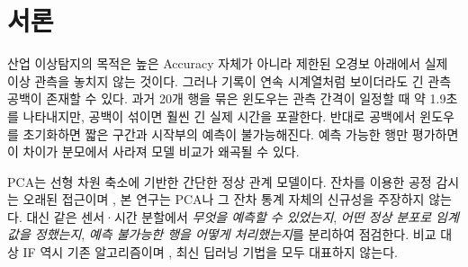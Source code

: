 \documentclass{article}
\begin{document}
\begin{abstract}
산업 센서 이상탐지에서 이동 윈도우의 시간 공백 처리와 예측 불가능한 관측의 제외는 모델 자체의 차이와 함께 평가 결과를 바꾼다.
본 연구는 유압펌프 진동 2채널·전류 1채널 자료에 대해 시간순 버스트 단위 분할, 정상 보정 자료의 경험적 임계값, 동일 관측 행 비교 및 부족한 윈도우의 단일 관측 보완을 결합한 평가 절차를 구현한다.
정상 자료로만 적합한 PCA의 잔차 $Q$, 유지 부분공간의 $T^2$, 보정 결합 점수를 비교하고, 동일 특징을 사용하는 Isolation Forest를 세 seed로 평가한다.
개발 자료로 선택하고 고정한 20행·2성분·$Q$ 기반 운영 모델은 최종 이상 357행 중 329행을 탐지하고 정상 3,990행 중 1행에 오경보를 냈으며, 동일 20행 특징의 IF는 각각 320행 탐지와 6행 오경보를 기록했다.
버스트 경계 초기화와 경보 지속 조건은 일부 조건에서 탐지를 개선하거나 오경보를 줄였지만 관측 범위 감소 및 추가 미탐을 동반했으며, 정상·이상 기록 날짜가 다른 단일 사례이므로 독립 고장 일반화나 고장 전 조기예측의 근거로 해석하지 않는다.
\end{abstract}

\section{서론}
산업 이상탐지의 목적은 높은 Accuracy 자체가 아니라 제한된 오경보 아래에서 실제 이상 관측을 놓치지 않는 것이다. 그러나 기록이 연속 시계열처럼 보이더라도 긴 관측 공백이 존재할 수 있다. 과거 20개 행을 묶은 윈도우는 관측 간격이 일정할 때 약 1.9초를 나타내지만, 공백이 섞이면 훨씬 긴 실제 시간을 포괄한다. 반대로 공백에서 윈도우를 초기화하면 짧은 구간과 시작부의 예측이 불가능해진다. 예측 가능한 행만 평가하면 이 차이가 분모에서 사라져 모델 비교가 왜곡될 수 있다.

PCA는 선형 차원 축소에 기반한 간단한 정상 관계 모델이다. 잔차를 이용한 공정 감시는 오래된 접근이며 \citep{jackson1979}, 본 연구는 PCA나 그 잔차 통계 자체의 신규성을 주장하지 않는다. 대신 같은 센서·시간 분할에서 \emph{무엇을 예측할 수 있었는지}, \emph{어떤 정상 분포로 임계값을 정했는지}, \emph{예측 불가능한 행을 어떻게 처리했는지}를 분리하여 점검한다. 비교 대상 IF 역시 기존 알고리즘이며 \citep{liu2008}, 최신 딥러닝 기법을 모두 대표하지 않는다.
\end{document}
